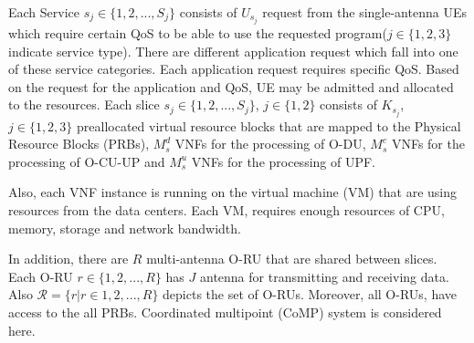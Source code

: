 \documentclass[conference]{IEEEtran}
\begin{document}
Each Service $s_j\in \{1,2,...,S_j \} $ consists of $U_{s_j}$ request from the 
single-antenna UEs which require certain QoS to be able to use the requested program($j \in \{1,2,3\}$ indicate service type).
There are different application request which fall into one of these service categories. Each application request requires specific QoS. Based on the request for the application and QoS, UE may be admitted and allocated to the resources.
Each slice $s_j \in \{1,2,...,S_j \}$, $j \in \{1,2\}$ consists of $K_{s_j}$, $j \in \{1,2,3\}$ preallocated virtual resource blocks that are mapped to the Physical Resource Blocks (PRBs), $M_s^{d}$ VNFs for the processing of O-DU, $M_s^{c}$ VNFs for the processing of O-CU-UP and $M_s^{u}$ VNFs for the processing of UPF.

Also, each VNF instance is running on the virtual machine (VM) that are using resources from the data centers. Each VM, requires enough resources of CPU, memory, storage and network bandwidth.

In addition, there are $R$ multi-antenna O-RU that are shared between slices. Each O-RU $r \in \{1,2,...,R \}$
has $J$ antenna for transmitting and receiving data.
Also $\mathcal{R} = \{ r | r\in 1,2,...,R \}$ depicts the set of O-RUs.
Moreover, all O-RUs, have access to the all PRBs.
Coordinated multipoint (CoMP) system is considered here. 
\end{document}
